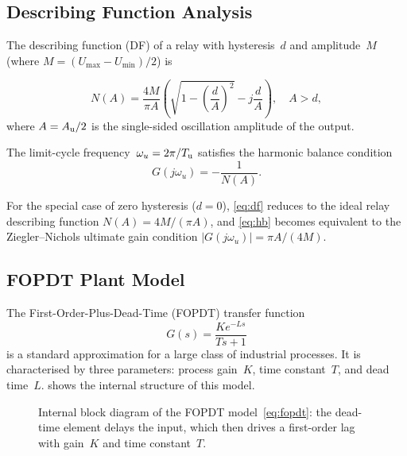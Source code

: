 \subsection{Describing Function Analysis}
\label{sec:theory:df}

The describing function (DF) of a relay with hysteresis~$d$ and amplitude~$M$
(where $M = (U_{\max} - U_{\min})/2$) is~\cite{Atherton1982}

\begin{equation}
    N(A) = \frac{4M}{\pi A}
           \left( \sqrt{1 - \left(\frac{d}{A}\right)^2}
                  - j \frac{d}{A} \right),
    \quad A > d,
    \label{eq:df}
\end{equation}
where $A = A_{\mathrm{u}}/2$ is the single-sided oscillation amplitude of the output.

The limit-cycle frequency~$\omega_u = 2\pi/T_{\mathrm{u}}$ satisfies the harmonic balance
condition
\begin{equation}
    G(j\omega_u) = -\frac{1}{N(A)}.
    \label{eq:hb}
\end{equation}

For the special case of zero hysteresis ($d = 0$), \eqref{eq:df} reduces to
the ideal relay describing function $N(A) = 4M/(\pi A)$, and
\eqref{eq:hb} becomes equivalent to the Ziegler--Nichols ultimate gain
condition $|G(j\omega_u)| = \pi A / (4M)$.

\subsection{FOPDT Plant Model}
\label{sec:theory:fopdt}

The First-Order-Plus-Dead-Time (FOPDT) transfer function
\begin{equation}
    G(s) = \frac{K e^{-Ls}}{Ts + 1}
    \label{eq:fopdt}
\end{equation}
is a standard approximation for a large class of industrial processes.
It is characterised by three parameters: process gain~$K$, time
constant~$T$, and dead time~$L$.
 shows the internal structure of this model.

\begin{figure}[htbp]
    \centering
    \caption{Internal block diagram of the FOPDT model~\eqref{eq:fopdt}:
             the dead-time element delays the input, which then drives a
             first-order lag with gain~$K$ and time constant~$T$.}
    \label{fig:fopdt_block}
\end{figure}

